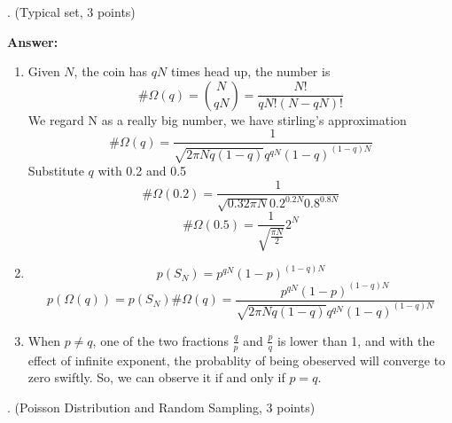 \documentclass[11pt]{article}
\begin{document}
. (Typical set, 3 points)

\textbf{Answer:}
\begin{enumerate}
    \item Given $N$, the coin has $qN$ times head up, the number is
    $$
    \#\Omega(q) = {N \choose qN} = \frac{N!}{qN!(N-qN)!}
    $$
    We regard N as a really big number, we have stirling's approximation
    $$
    \#\Omega(q) = \frac{1}{\sqrt{2\pi N q(1-q)}q^{qN}(1-q)^{(1-q)N}}
    $$ 
    Substitute $q$ with 0.2 and 0.5
    $$
    \#\Omega(0.2) = \frac{1}{\sqrt{0.32\pi N}0.2^{0.2N}0.8^{0.8N}}
    $$
    $$
    \#\Omega(0.5) = \frac{1}{\sqrt{\frac{\pi N}{2}}}2^N
    $$
    \item 
    $$
    p(S_N) = p^{qN}(1-p)^{(1-q)N}
    $$
    $$
    p(\Omega(q)) = p(S_N)\#\Omega(q) = \frac{p^{qN}(1-p)^{(1-q)N}}{\sqrt{2\pi N q(1-q)}q^{qN}(1-q)^{(1-q)N}}
    $$
    \item
    When $p\neq q$, one of the two fractions $\frac{q}{p}$ and $\frac{p}{q}$ is lower than 1,
    and with the effect of infinite exponent, the probablity of being obeserved will converge to zero swiftly.
    So, we can observe it if and only if $p = q$.
\end{enumerate}

. (Poisson Distribution and Random Sampling, 3 points)
\end{document}
